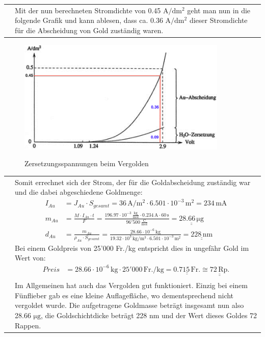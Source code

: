\begin{longtable}{p{3cm}p{14cm}}
    & Mit der nun berechneten Stromdichte von 0.45 $\mathrm{A/dm^2}$ geht man nun in die folgende Grafik und kann ablesen, dass ca. 0.36 $\mathrm{A/dm^2}$ dieser Stromdichte für die Abscheidung von Gold zuständig waren.
\end{longtable}

\begin{figure}[H]\centering
    \includegraphics[width=10cm]{./pictures/AuAbscheidung.png}\\
    \caption{Zersetzungsspannungen beim Vergolden}
\end{figure}

\begin{longtable}{p{3cm}p{14cm}}
    & Somit errechnet sich der Strom, der für die Goldabscheidung zuständig war und die dabei abgeschiedene Goldmenge:
    $$\begin{aligned}
        I_{Au} &= J_{Au} \cdot S_{gesamt} = 36 \, \mathrm{A/m^2} \cdot 6.501 \cdot 10^{-3} \, \mathrm{m^2} = 234 \, \mathrm{mA}\\
        m_{Au} &= \frac{M \cdot I_{Au} \cdot t}{F} = \frac{196.97 \cdot 10^{-3} \, \frac{\mathrm{kg}}{\mathrm{mol}} \cdot 0.234 \, \mathrm{A} \cdot 60 \, \mathrm{s}}{96'500 \, \frac{\mathrm{C}}{\mathrm{mol}}} = \underline{\underline{28.66 \, \mathrm{\mu g}}}\\
        d_{Au} &= \frac{m_{Au}}{\rho_{Au} \cdot S_{gesamt}} = \frac{28.66 \cdot 10^{-6} \, \mathrm{kg}}{19.32 \cdot 10^3 \, \mathrm{kg/m^3} \cdot 6.501 \cdot 10^{-3} \, \mathrm{m^2}} = \underline{\underline{228 \, \mathrm{nm}}}
    \end{aligned}$$
    Bei einem Goldpreis von 25'000 Fr./kg entspricht dies in ungefähr Gold im Wert von:
    $$\begin{aligned}
        Preis &= 28.66 \cdot 10^{-6} \, \mathrm{kg} \cdot 25'000 \, \mathrm{Fr./kg} = \underline{\underline{0.715  \, \mathrm{Fr.}}} \cong \underline{\underline{72 \, \mathrm{Rp.}}}
    \end{aligned}$$\\
    
    & Im Allgemeinen hat auch das Vergolden gut funktioniert. Einzig bei einem Fünflieber gab es eine kleine Auflagefläche, wo dementsprechend nicht vergoldet wurde. Die aufgetragene Goldmasse beträgt insgesamt nun also 28.66 $\mathrm{\mu g}$, die Goldschichtdicke beträgt 228 nm und der Wert dieses Goldes 72 Rappen.
    
\end{longtable}